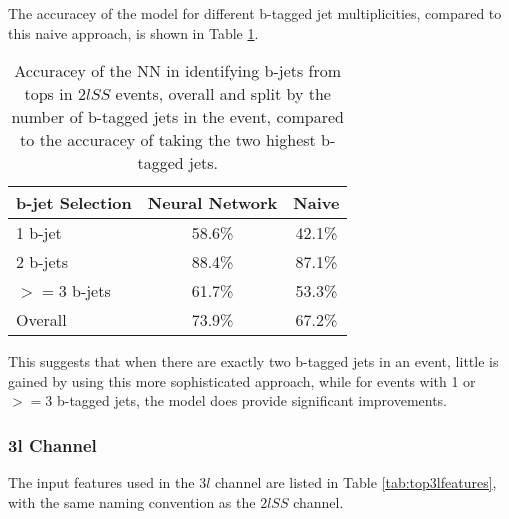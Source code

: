 The accuracey of the model for different b-tagged jet multiplicities, compared to this naive approach, is shown in Table \ref{tab:topMatchAcc2lSS}.

\begin{table}[H]
  \centering
  \begin{tabular}{|l|c|c|}
    \hline\hline
    b-jet Selection & Neural Network & Naive \\
    \hline
    1 b-jet & 58.6\% & 42.1\% \\
    2 b-jets & 88.4\% & 87.1\% \\
    $>=$3 b-jets & 61.7\% & 53.3\% \\
    \hline
    Overall & 73.9\% & 67.2\% \\                                                                                  
    \hline                                                                                                 
  \end{tabular}
  \caption{Accuracey of the NN in identifying b-jets from tops in $2lSS$ events, overall and split by the number of b-tagged jets in the event, compared to the accuracey of taking the two highest b-tagged jets.}     
  \label{tab:topMatchAcc2lSS}                                                                                           
\end{table}

This suggests that when there are exactly two b-tagged jets in an event, little is gained by using this more sophisticated approach, while for events with 1 or $>=3$ b-tagged jets, the model does provide significant improvements.

\subsubsection{3l Channel}
\label{subsec:top3l}
 
The input features used in the $3l$  channel are listed in Table \ref{tab:top3lfeatures}, with the same naming convention as the $2lSS$ channel.

